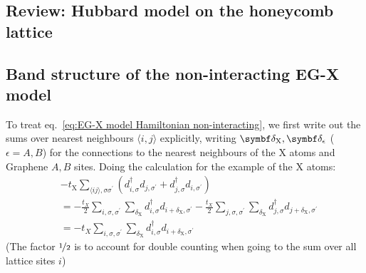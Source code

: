 \documentclass[../notes.tex]{subfiles}
\begin{document}
\subsection{Review: Hubbard model on the honeycomb lattice}\label{subsec:review:-hubbard-model-on-the-honeycomb-lattice}


\subsection{Band structure of the non-interacting EG-X model}\label{subsec:band-structure-of-the-non-interacting-eg-x-model}

To treat eq.~\ref{eq:EG-X model Hamiltonian non-interacting}, we first write out the sums over nearest neighbours \(\langle i, j \rangle\) explicitly, writing \(\vb{\delta}_{\mathrm{X}}, \vb{\delta}_{\epsilon}\) (\(\epsilon = A, B\)) for the connections to the nearest neighbours of the \(\mathrm{X}\) atoms and Graphene \(A, B\) sites.
Doing the calculation for the example of the \(\mathrm{X}\) atoms:
\begin{align}
	&-t_{\mathrm{X}} \sum_{\langle ij \rangle, \sigma \sigma^{\prime}} (d_{i, \sigma}^{\dagger} d_{j, \sigma^{\prime}} + d_{j, \sigma}^{\dagger} d_{i, \sigma^{\prime}}) \\
	&= -\frac{t_X}{2} \sum_{i,\sigma, \sigma^{\prime}} \sum_{\delta_{\mathrm{X}}} d_{i, \sigma}^{\dagger} d_{i + \delta_{\mathrm{X}}, \sigma^{\prime}}
	-\frac{t_X}{2} \sum_{j,\sigma, \sigma^{\prime}} \sum_{\delta_{\mathrm{X}}} d_{j, \sigma}^{\dagger} d_{j + \delta_{\mathrm{X}}, \sigma^{\prime}} \\
	&= -t_X \sum_{i,\sigma, \sigma^{\prime}} \sum_{\delta_{\mathrm{X}}} d_{i, \sigma}^{\dagger} d_{i + \delta_{\mathrm{X}}, \sigma^{\prime}}
	\label{eq:EG-X model X atoms nearest neighbours written out}
\end{align}
(The factor \(\nicefrac{1}{2}\) is to account for double counting when going to the sum over all lattice sites \(i\))
\end{document}
